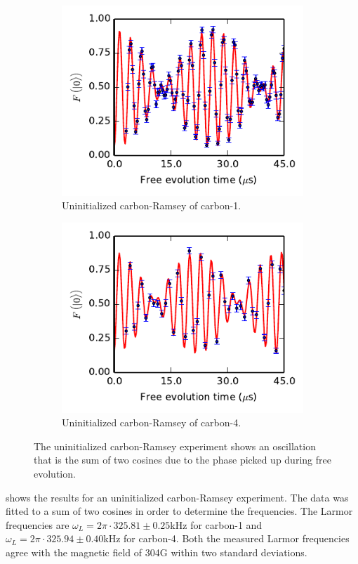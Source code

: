\begin{figure}[htbp]
    \begin{subfigure}[t]{0.49\textwidth}\centering
    \includegraphics{Img/CarbonRamsey_C1.pdf}
    \caption{Uninitialized carbon-Ramsey of carbon-1.}
    \label{fig:CR_C1}
    \end{subfigure}
    \begin{subfigure}[t]{0.49\textwidth}\centering
        \includegraphics{Img/CarbonRamsey_C4.pdf}
        \caption{Uninitialized carbon-Ramsey of carbon-4.}
        \label{fig:CR_C4}
    \end{subfigure}
    \caption{The uninitialized carbon-Ramsey experiment shows an oscillation that is the sum of two cosines due to the phase picked up during free evolution.}
    \label{fig:Uninitialized_carbon_ramsey}
\end{figure}

 shows the results for an uninitialized carbon-Ramsey experiment.
The data was fitted to a sum of two cosines in order to determine the frequencies.
The Larmor frequencies are $\omega_L = 2\pi\cdot 325.81 \pm 0.25$kHz  for carbon-1 and  $\omega_L =  2\pi\cdot 325.94 \pm 0.40$kHz for carbon-4.
Both the measured Larmor frequencies agree with the magnetic field of 304G within two standard deviations.

